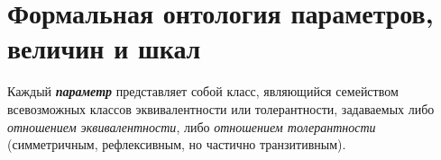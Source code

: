\begin{comment}
\scnheader{соответствие*}
\scnidtf{наличие соответствия*}
\scniselement{бинарное отношение}
\begin{scnsubdividing}
	\scnitem{соответствие между непересекающимися множествами*}
	\scnitem{соответствие между строго пересекающимися множествами*}
	\scnitem{соответствие, область отправления и область прибытия которого совпадают*}
\end{scnsubdividing}
\begin{scnsubdividing}
	\scnitem{всюду определенное соответствие*}
	\scnitem{частично определенное соответствие*}
\end{scnsubdividing}
\begin{scnsubdividing}
	\scnitem{сюръекция*}
	\scnitem{несюръективное соответствие*}
\end{scnsubdividing}
\begin{scnsubdividing}
	\scnitem{однозначное соответствие*}
	\scnitem{неоднозначное соответствие*}
\end{scnsubdividing}
\scntext{определение}{\textbf{\textit{соответствие*}} --- \textit{бинарное ориентированное отношение}, каждая пара которого связывает два множества и указывает на наличие некоторого отношения, связывающего элементы этих двух множеств.}
	
	
\scnheader{область отправления\scnrolesign}
\scnidtf{область отправления соответствия\scnrolesign}
\scnidtf{область определения соответствия\scnrolesign}
\scnidtf{первый компонент пары в отношении соответствия\scnrolesign}
\scniselement{ролевое отношение}
\scntext{определение}{\textbf{\textit{область отправления\scnrolesign}} --- \textit{ролевое отношение}, указывающее на первый компонент пары в рамках отношения \textit{соответствие*}.}
	
\scnheader{область прибытия\scnrolesign}
\scnidtf{область прибытия соответствия\scnrolesign}
\scnidtf{область значений соответствия\scnrolesign}
\scniselement{ролевое отношение}
\scntext{определение}{\textbf{\textit{область прибытия\scnrolesign}} --- \textit{ролевое отношение}, указывающее на второй компонент пары в рамках отношения \textit{соответствие*}.}
\end{SCn}


\end{comment}
\section{Формальная онтология параметров, величин и шкал}
\label{sec_top_ontologies_params}

Каждый \textbf{\textit{параметр}} представляет собой класс, являющийся семейством всевозможных классов эквивалентности или толерантности, задаваемых либо \textit{отношением эквивалентности}, либо \textit{отношением толерантности} (симметричным, рефлексивным, но частично транзитивным).

